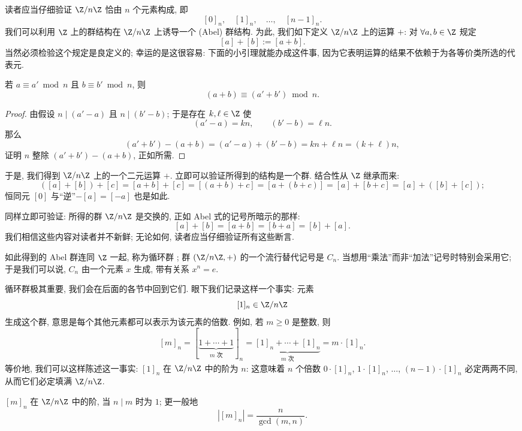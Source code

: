 读者应当仔细验证 $\Z/n\Z$ 恰由 $n$ 个元素构成, 即
\[
[0]_n, \quad [1]_n, \quad \ldots, \quad [n-1]_n.
\]
我们可以利用 $\Z$ 上的群结构在 $\Z/n\Z$ 上诱导一个 (Abel) 群结构. 为此, 我们如下定义 $\Z/n\Z$ 上的运算 $+$: 对 $\forall a, b \in \Z$ 规定
\[
[a] + [b] := [a + b].
\]
当然必须检验这个规定是良定义的; 幸运的是这很容易: 下面的小引理就能办成这件事, 因为它表明运算的结果不依赖于为各等价类所选的代表元.

\begin{lemma}
\label{lem:congruence-add}
若 $a \equiv a' \bmod n$ 且 $b \equiv b' \bmod n$, 则
\[
(a + b) \equiv (a' + b') \bmod n.
\]
\end{lemma}

\begin{proof}
由假设 $n \mid (a' - a)$ 且 $n \mid (b' - b)$; 于是存在 $k, \ell \in \Z$ 使
\[
(a' - a) = kn, \qquad (b' - b) = \ell n.
\]
那么
\[
(a' + b') - (a + b) = (a' - a) + (b' - b) = kn + \ell n = (k + \ell) n,
\]
证明 $n$ 整除 $(a' + b') - (a + b)$, 正如所需.
\end{proof}

于是, 我们得到 $\Z/n\Z$ 上的一个二元运算 $+$. 立即可以验证所得到的结构是一个群. 结合性从 $\Z$ 继承而来:
\[
([a] + [b]) + [c] = [a + b] + [c] = [(a+b) + c] = [a + (b+c)] = [a] + [b+c] = [a] + ([b] + [c]);
\]
恒同元 $[0]$ 与``逆''$-[a] = [-a]$ 也是如此.

同样立即可验证: 所得的群 $\Z/n\Z$ 是交换的, 正如 Abel 式的记号所暗示的那样:
\[
[a] + [b] = [a + b] = [b + a] = [b] + [a].
\]
我们相信这些内容对读者并不新鲜; 无论如何, 读者应当仔细验证所有这些断言.

如此得到的 Abel 群连同 $\Z$ 一起, 称为循环群%
; 群 $(\Z/n\Z, +)$ 的一个流行替代记号是 $C_n$. 当想用``乘法''而非``加法''记号时特别会采用它; 于是我们可以说, $C_n$ 由一个元素 $x$ 生成, 带有关系 $x^n = e$.

循环群极其重要, 我们会在后面的各节中回到它们. 眼下我们记录这样一个事实: 元素
\[
[1]_n \in \Z/n\Z
\]
生成这个群, 意思是每个其他元素都可以表示为该元素的倍数. 例如, 若 $m \geq 0$ 是整数, 则
\[
[m]_n = [\underbrace{1 + \cdots + 1}_{m \text{ 次}}]_n = \underbrace{[1]_n + \cdots + [1]_n}_{m \text{ 次}} = m \cdot [1]_n.
\]
等价地, 我们可以这样陈述这一事实: $[1]_n$ 在 $\Z/n\Z$ 中的阶为 $n$: 这意味着 $n$ 个倍数 $0 \cdot [1]_n$, $1 \cdot [1]_n$, $\ldots$, $(n-1) \cdot [1]_n$ 必定两两不同, 从而它们必定填满 $\Z/n\Z$.

\begin{proposition}
\label{prop:order-class}
$[m]_n$ 在 $\Z/n\Z$ 中的阶, 当 $n \mid m$ 时为 $1$; 更一般地
\[
|[m]_n| = \frac{n}{\gcd(m, n)}.
\]
\end{proposition}

